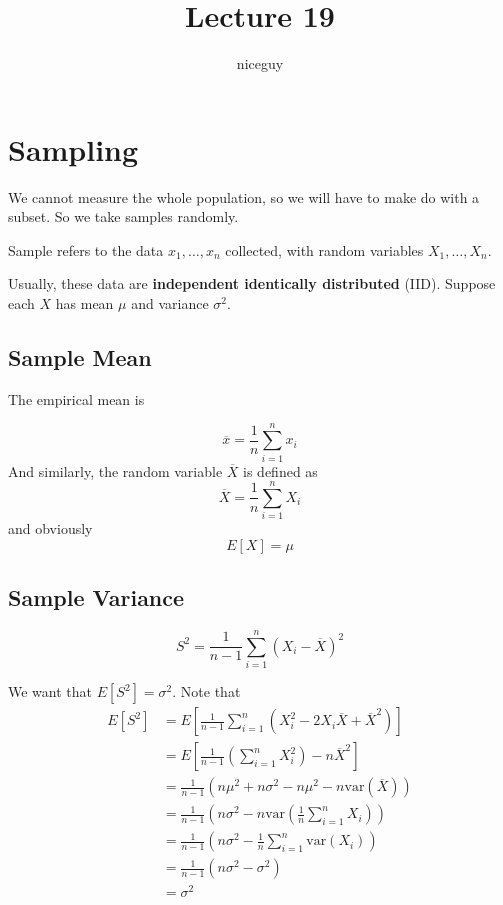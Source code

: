 \documentclass[12pt]{article}
\author{niceguy}
\title{Lecture 19}
\begin{document}
\maketitle

\section{Sampling}
We cannot measure the whole population, so we will have to make do with a subset. So we take samples randomly.

\begin{defn}
	Sample refers to the data $x_1,\dots,x_n$ collected, with random variables $X_1,\dots,X_n$.
\end{defn}

Usually, these data are \textbf{independent identically distributed} (IID). Suppose each $X$ has mean $\mu$ and variance $\sigma^2$.

\subsection{Sample Mean}

The empirical mean is

$$\overline{x} = \frac{1}{n} \sum_{i=1}^n x_i$$
And similarly, the random variable $\overline{X}$ is defined as
$$\overline{X} = \frac{1}{n} \sum_{i=1}^n X_i$$
and obviously
$$E[X] = \mu$$

\subsection{Sample Variance}

$$S^2 = \frac{1}{n-1} \sum_{i=1}^n (X_i - \overline{X})^2$$

We want that $E[S^2] = \sigma^2$. Note that
\begin{align*}
	E[S^2] &= E\left[\frac{1}{n-1} \sum_{i=1}^n (X_i^2 - 2X_i\overline{X} + \overline{X}^2)\right] \\
	       &= E\left[\frac{1}{n-1} \left(\sum_{i=1}^n X_i^2\right) - n\overline{X}^2\right] \\
	       &= \frac{1}{n-1}\left(n\mu^2 + n\sigma^2 - n\mu^2 - n\text{var}(\overline{X})\right) \\
	       &= \frac{1}{n-1}\left(n\sigma^2 - n\text{var}\left(\frac{1}{n}\sum_{i=1}^n X_i\right)\right) \\
	       &= \frac{1}{n-1} \left(n\sigma^2 - \frac{1}{n}\sum_{i=1}^n\text{var}(X_i)\right) \\
	       &= \frac{1}{n-1} (n\sigma^2 - \sigma^2) \\
	       &= \sigma^2
\end{align*}
\end{document}

